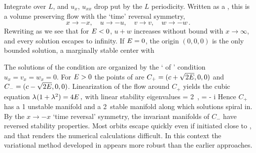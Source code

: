  Integrate over $L$, and $u_x$, $u_{xx}$ drop put by the
  $L$ periodicity.
 Written as a ,
 this is a volume preserving flow
 with the `time' reversal symmetry,
 \[
 x \to -x,\quad u \to -u, \quad v \to v, \quad w \to -w \,.
 \]
  Rewriting  as
 \beq
 we see that
 for $E<0$,
 $u+w$ increases without bound with $x \to \infty$,
 and every solution escapes to infinity.
 If $E=0$, the origin $(0,0,0)$ is the
 only bounded  solution, a marginally stable center with

\bigskip

 The solutions of the {\eqv}  condition
  are
 organized by the
 `{\eqva}  of {\eqva}'  condition
 \( u_x= v_x= w_x= 0 \).
     For $E>0$ the {\reqva}  points of  are
 $C_{+}=(c+\sqrt{2E},0,0)$ and $C_{-}=(c-\sqrt{2E},0,0)$.
 Linearization of the flow around $C_{+}$ yields the cubic equation
 $ %
 \eigExp(1+\eigExp^2) = 4 \expctE
 \,,
 $ %
 with linear stability eigenvalues
 \beq
 \eigExp[1] = 2 \eigRe
     \,,\qquad
 \eigExp[2,3] = - \eigRe \pm i \eigIm
 Hence $C_{+}$ has a {1\dmn}
 unstable manifold and a 2\dmn\ stable manifold
 along which solutions spiral in.
 By the $x \to -x$ `time reversal' symmetry, the
 invariant manifolds of $C_{-}$
 have reversed stability properties.
 Most orbits escape quickly even if initiated close to \eqva, and that
 renders the numerical calculations
 difficult.
 In this context the variational method
 developed in 
 appears more robust than
 the earlier approaches.

